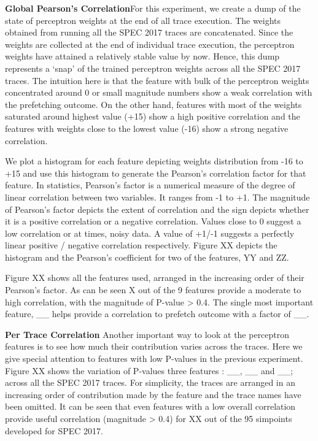 \textbf{Global Pearson's Correlation}\newline For this experiment, we create a
dump of the state of perceptron weights at the end of all trace execution.
The weights obtained from running all the SPEC 2017 traces are concatenated.
Since the weights are collected at the end of individual trace execution, the
perceptron weights have attained a relatively stable value by now.  Hence,
this dump represents a `snap' of the trained perceptron weights across all the
SPEC 2017 traces.  The intuition here is that the feature with bulk of the
perceptron weights concentrated around 0 or small magnitude numbers show a
weak correlation with the prefetching outcome.  On the other hand, features
with most of the weights saturated around highest value (+15) show a high
positive correlation and the features with weights close to the lowest value
(-16) show a strong negative correlation.

We plot a histogram for each feature depicting weights distribution
from -16 to +15 and use this histogram to generate the Pearson's
correlation factor for that feature.  In statistics, Pearson's factor
is a numerical measure of the degree of linear correlation between two
variables.  It ranges from -1 to +1.  The magnitude of Pearson's
factor depicts the extent of correlation and the sign depicts whether
it is a positive correlation or a negative correlation.  Values close
to 0 suggest a low correlation or at times, noisy data.  A value of
+1/-1 suggests a perfectly linear positive / negative correlation
respectively.  Figure XX depicts the histogram and the Pearson's
coefficient for two of the features, YY and ZZ.

Figure XX shows all the features used, arranged in the increasing
order of their Pearson's factor.  As can be seen X out of the 9
features provide a moderate to high correlation, with the magnitude of
P-value > 0.4.  The single most important feature, \_\_ helps provide
a correlation to prefetch outcome with a factor of \_\_.

\textbf{Per Trace Correlation} \newline Another important way to look
at the perceptron features is to see how much their contribution
varies across the traces.  Here we give special attention to features
with low P-values in the previous experiment.  Figure XX shows the
variation of P-values three features : \_\_, \_\_ and \_\_; across all
the SPEC 2017 traces.  For simplicity, the traces are arranged in an
increasing order of contribution made by the feature and the trace
names have been omitted.  It can be seen that even features with a low
overall correlation provide useful correlation (magnitude > 0.4) for
XX out of the 95 simpoints developed for SPEC 2017.  

